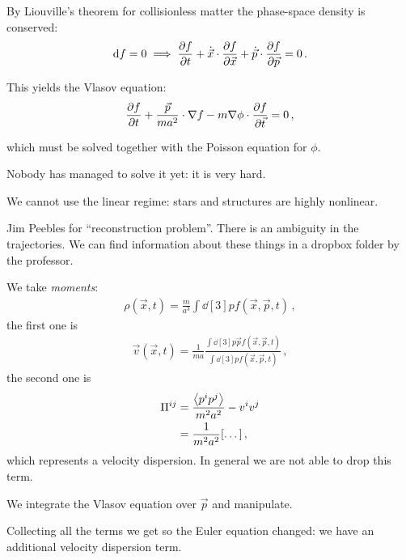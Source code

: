 \documentclass[main.tex]{subfiles}
\begin{document}
By Liouville's theorem for collisionless matter the phase-space density is conserved: 
%
\begin{align}
\dd{f} = 0 \implies 
\pdv{f}{t} + \dot{\vec{x}} \cdot \pdv{f}{\vec{x}} + \dot{\vec{p}} \cdot \pdv{f}{\vec{p}} = 0
\,.
\end{align}

This yields the Vlasov equation: 
%
\begin{align}
\pdv{f}{t} + \frac{\vec{p}}{m a^2} \cdot \nabla f - m \nabla \phi \cdot \pdv{f}{\vec{t}}= 0
\,,
\end{align}

which must be solved together with the Poisson equation for \(\phi \).

Nobody has managed to solve it yet: it is very hard. 

We cannot use the linear regime: stars and structures are highly nonlinear. 

Jim Peebles for ``reconstruction problem''.
There is an ambiguity in the trajectories. 
We can find information about these things in a dropbox folder by the professor. 

We take \emph{moments}: 
%
\begin{align}
\rho (\vec{x}, t) = \frac{m}{a^3} \int \dd[3]{p} 
f(\vec{x}, \vec{p}, t)
\,,
\end{align}
%
the first one is
%
\begin{align}
\vec{v}(\vec{x}, t) = \frac{1}{ma} \frac{\int \dd[3]{p} \vec{p} f (\vec{x}, \vec{p}, t)}{\int \dd[3]{p} f(\vec{x}, \vec{p}, t)}
\,,
\end{align}
%
the second one is 
%
\begin{subequations}
\begin{align}
\Pi^{ij} &= \frac{\expval{p^{i} p^{j}}}{m^2a^2} - v^{i} v^{j}  \\
&= \frac{1}{m^2a^2} \qty[\dots]
\,,
\end{align}
\end{subequations}
%
which represents a velocity dispersion. In general we are not able to drop this term. 

We integrate the Vlasov equation over \(\vec{p}\) and manipulate. 

Collecting all the terms we get 
%
%
so the Euler equation changed: we have an additional velocity dispersion term.
\end{document}
